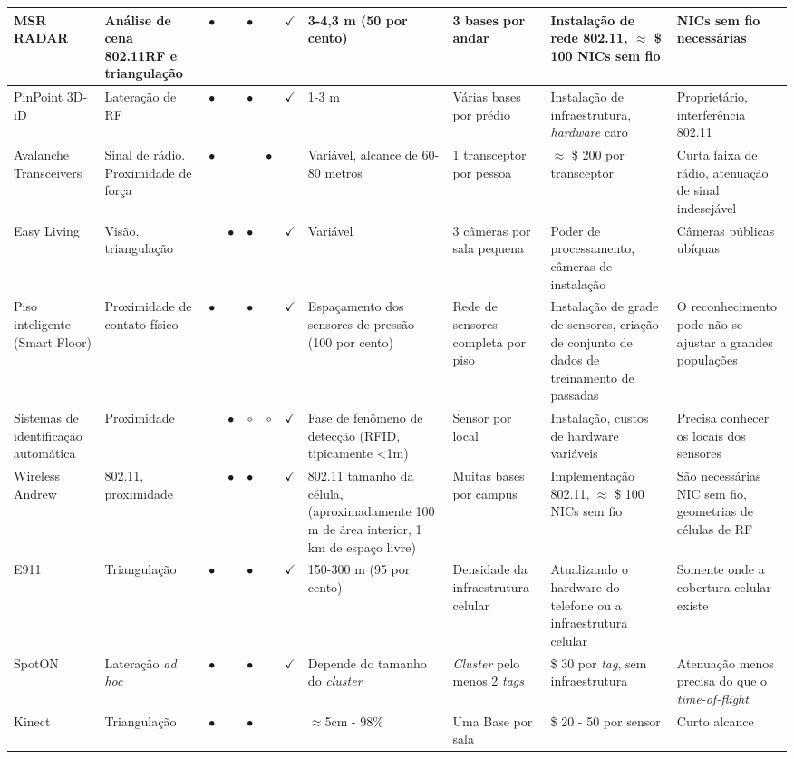 \begin{table*}[!ht]
\begin{tabular}{|p{1cm}p{1.3cm}cccccp{1.6cm}p{1.5cm}p{1.5cm}p{1.5cm}|}
MSR RADAR & Análise de cena 802.11RF e triangulação & $\bullet$& & $\bullet$ & & $\checkmark$ & 3-4,3 m (50 por cento)& 3 bases por andar & Instalação de rede 802.11, $\approx$ \$ 100 NICs sem fio & NICs sem fio necessárias\\\hline
PinPoint 3D-iD & Lateração de RF & $\bullet$ & & $\bullet$ & & $\checkmark$ & 1-3 m & Várias bases por prédio & Instalação de infraestrutura, \textit{hardware} caro & Proprietário, interferência 802.11\\\hline
Avalanche Transceivers & Sinal de rádio. Proximidade de força & $\bullet$ & & & $\bullet$ & & Variável, alcance de 60-80 metros & 1 transceptor por pessoa & $\approx$ \$ 200 por transceptor&  Curta faixa de rádio, atenuação de sinal indesejável\\\hline
Easy Living & Visão, triangulação & & $\bullet$ & $\bullet$ & & $\checkmark$ & Variável & 3 câmeras por sala pequena & Poder de processamento, câmeras de instalação & Câmeras públicas ubíquas\\\hline
Piso inteligente (Smart Floor) & Proximidade de contato físico & $\bullet$ & & $\bullet$ & & $\checkmark$ & Espaçamento dos sensores de pressão (100 por cento) & Rede de sensores completa por piso & Instalação de grade de sensores, criação de conjunto de dados de treinamento de passadas & O reconhecimento pode não se ajustar a grandes populações\\\hline
Sistemas de identificação automática & Proximidade & & $\bullet$ & $\circ$ & $\circ$ & $\checkmark$ & Fase de fenômeno de detecção (RFID, tipicamente <1m) & Sensor por local & Instalação, custos de hardware variáveis & Precisa conhecer os locais dos sensores\\\hline
Wireless Andrew & 802.11, proximidade & & $\bullet$ & $\bullet$ & & $\checkmark$ & 802.11 tamanho da célula, (aproximadamente 100 m de área interior, 1 km de espaço livre) & Muitas bases por campus & Implementação 802.11, $\approx$ \$ 100 NICs sem fio & São necessárias NIC sem fio, geometrias de células de RF\\\hline
E911 & Triangulação & $\bullet$& & $\bullet$ & & $\checkmark$ & 150-300 m (95 por cento) & Densidade da infraestrutura celular & Atualizando o hardware do telefone ou a infraestrutura celular & Somente onde a cobertura celular existe\\\hline
SpotON & Lateração \textit{ad hoc} & $\bullet$ & & $\bullet$ & & $\checkmark$ & Depende do tamanho do \textit{cluster} & \textit{Cluster} pelo menos 2 \textit{tags} & \$ 30 por \textit{tag}, sem infraestrutura & Atenuação menos precisa do que o \textit{time-of-flight}\\\hline
Kinect & Triangulação & $\bullet$ & & $\bullet$ & & & $\approx$5cm - 98\% & Uma Base por sala & \$ 20 - 50 por sensor & Curto alcance\\\hline
\end{tabular}
\end{table*}